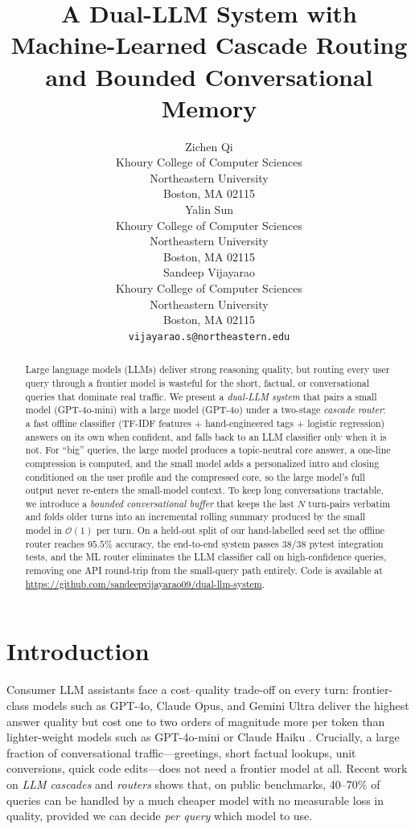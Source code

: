 \documentclass{article}
\title{A Dual-LLM System with Machine-Learned Cascade Routing and
Bounded Conversational Memory}
\author{%
  Zichen Qi \\
  Khoury College of Computer Sciences\\
  Northeastern University\\
  Boston, MA 02115 \\
  \And
  Yalin Sun \\
  Khoury College of Computer Sciences\\
  Northeastern University\\
  Boston, MA 02115 \\
  \And
  Sandeep Vijayarao \\
  Khoury College of Computer Sciences\\
  Northeastern University\\
  Boston, MA 02115 \\
  \texttt{vijayarao.s@northeastern.edu} \\
}
\begin{document}
\maketitle

\begin{abstract}
Large language models (LLMs) deliver strong reasoning quality, but routing every
user query through a frontier model is wasteful for the short, factual, or
conversational queries that dominate real traffic. We present a
\emph{dual-LLM system} that pairs a small model (GPT-4o-mini) with a large
model (GPT-4o) under a two-stage \emph{cascade router}: a fast offline classifier
(TF-IDF features $+$ hand-engineered tags $+$ logistic regression) answers on
its own when confident, and falls back to an LLM classifier only when it is
not. For ``big'' queries, the large model produces a topic-neutral core
answer, a one-line compression is computed, and the small model adds a
personalized intro and closing conditioned on the user profile and the
compressed core, so the large model's full output never re-enters the
small-model context. To keep long conversations tractable, we introduce a
\emph{bounded conversational buffer} that keeps the last $N$ turn-pairs
verbatim and folds older turns into an incremental rolling summary produced
by the small model in $\mathcal{O}(1)$ per turn. On a held-out split of our
hand-labelled seed set the offline router reaches
$95.5\%$ accuracy, the end-to-end system passes $38/38$ pytest integration
tests, and the ML router eliminates the LLM classifier call on high-confidence
queries, removing one API round-trip from the small-query path entirely.
Code is available at \url{https://github.com/sandeepvijayarao09/dual-llm-system}.
\end{abstract}

\section{Introduction}
\label{sec:intro}

Consumer LLM assistants face a cost--quality trade-off on every turn:
frontier-class models such as GPT-4o, Claude Opus, and Gemini Ultra deliver
the highest answer quality but cost one to two orders of magnitude more per
token than lighter-weight models such as GPT-4o-mini or Claude Haiku
\citep{openai_pricing_2024}. Crucially, a large fraction of conversational
traffic---greetings, short factual lookups, unit conversions,
quick code edits---does not need a frontier model at all. Recent work on
\emph{LLM cascades} and \emph{routers} \citep{chen_frugalgpt_2023,
ong_routellm_2024} shows that, on public benchmarks, 40--70\% of queries
can be handled by a much cheaper model with no measurable loss in quality,
provided we can decide \emph{per query} which model to use.
\end{document}
